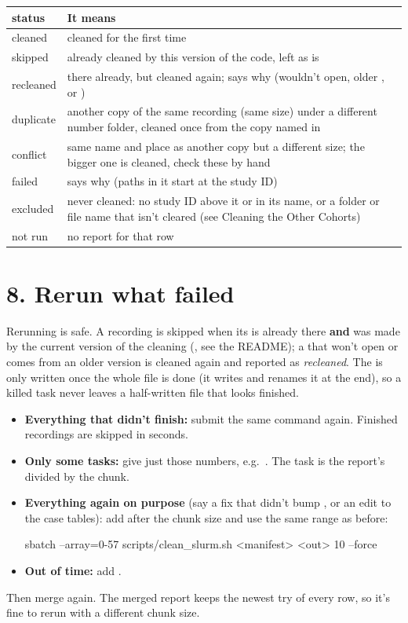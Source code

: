 \begin{tabularx}{\textwidth}{@{}l Y@{}}
\toprule
\textbf{status} & \textbf{It means} \\
\midrule
cleaned & cleaned for the first time \\
skipped & already cleaned by this version of the code, left as is \\
recleaned & there already, but cleaned again;  says why (wouldn't open, older , or ) \\
duplicate & another copy of the same recording (same size) under a different number folder, cleaned once from the copy named in  \\
conflict & same name and place as another copy but a different size; the bigger one is cleaned, check these by hand \\
failed &  says why (paths in it start at the study ID) \\
excluded & never cleaned: no study ID above it or in its name, or a folder or file name that isn't cleared (see Cleaning the Other Cohorts) \\
not run & no report for that row \\
\bottomrule
\end{tabularx}

\section{8. Rerun what failed}
Rerunning is safe. A recording is skipped when its  is already there \textbf{and} was made by the current version of the cleaning (, see the README); a  that won't open or comes from an older version is cleaned again and reported as \textit{recleaned}. The  is only written once the whole file is done (it writes  and renames it at the end), so a killed task never leaves a half-written file that looks finished.
\begin{itemize}
  \item \textbf{Everything that didn't finish:} submit the same  command again. Finished recordings are skipped in seconds.
  \item \textbf{Only some tasks:} give just those numbers, e.g.\ . The task is the report's  divided by the chunk.
  \item \textbf{Everything again on purpose} (say a fix that didn't bump , or an edit to the case tables): add  after the chunk size and use the same range as before:
\begin{codebox}
sbatch --array=0-57 scripts/clean_slurm.sh <manifest> <out> 10 --force
\end{codebox}
  \item \textbf{Out of time:} add .
\end{itemize}
Then merge again. The merged report keeps the newest try of every row, so it's fine to rerun with a different chunk size.

